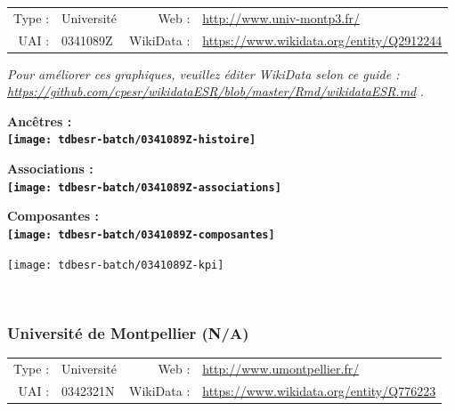 \documentclass[12pt,french,]{article}
\begin{document}
\begin{tabular*}{\textwidth}{rp{5cm}rl}  
\hline  
Type : & Université & Web : &\href{http://www.univ-montp3.fr/}{http://www.univ-montp3.fr/} \\  
UAI : & 0341089Z & WikiData : & \href{https://www.wikidata.org/entity/Q2912244}{https://www.wikidata.org/entity/Q2912244} \\  
\hline  
\end{tabular*}

\textit{\scriptsize Pour améliorer ces graphiques, veuillez éditer WikiData selon ce guide :  \href{https://github.com/cpesr/wikidataESR/blob/master/Rmd/wikidataESR.md}{https://github.com/cpesr/wikidataESR/blob/master/Rmd/wikidataESR.md}}
.

\vspace{1cm}  
\begin{minipage}[b]{0.50\textwidth}\begin{center} \bf Ancêtres : \\  
\texttt{[image: tdbesr-batch/0341089Z-histoire]} \end{center}\end{minipage}\begin{minipage}[b]{0.50\textwidth}\begin{center} \bf Associations : \\  
\texttt{[image: tdbesr-batch/0341089Z-associations]} \end{center}\end{minipage}

\hrulefill

\begin{center} \bf Composantes : \\  
\texttt{[image: tdbesr-batch/0341089Z-composantes]} \end{center}

\begin{center}\texttt{[image: tdbesr-batch/0341089Z-kpi]} \end{center}\checkoddpage

\ifoddpage \fi ~\newpage  

\hypertarget{universituxe9-de-montpellier-na}{%
\subsubsection{Université de Montpellier
(N/A)}\label{universituxe9-de-montpellier-na}}

\begin{tabular*}{\textwidth}{rp{5cm}rl}  
\hline  
Type : & Université & Web : &\href{http://www.umontpellier.fr/}{http://www.umontpellier.fr/} \\  
UAI : & 0342321N & WikiData : & \href{https://www.wikidata.org/entity/Q776223}{https://www.wikidata.org/entity/Q776223} \\  
\hline  
\end{tabular*}
\end{document}
